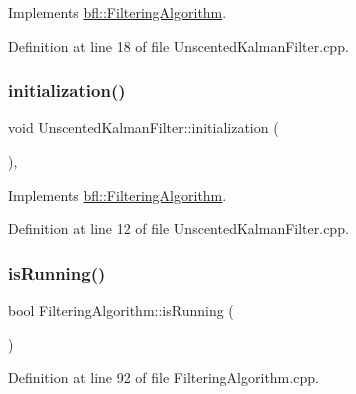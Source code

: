 Implements \mbox{\hyperlink{classbfl_1_1FilteringAlgorithm_acdfebf68405a427491e4dd9d020ae09b}{bfl\+::\+Filtering\+Algorithm}}.



Definition at line 18 of file Unscented\+Kalman\+Filter.\+cpp.

\mbox{\label{classbfl_1_1UnscentedKalmanFilter_acd5cfc6344d9ce24fb980aa22ecf4895}} 
\subsubsection{\texorpdfstring{initialization()}{initialization()}}
{\footnotesize\ttfamily void Unscented\+Kalman\+Filter\+::initialization (\begin{DoxyParamCaption}{ }\end{DoxyParamCaption})\hspace{0.3cm}{\ttfamily [override]}, {\ttfamily [virtual]}}



Implements \mbox{\hyperlink{classbfl_1_1FilteringAlgorithm_af2a072aa51407fe5544bdbb7ce466e2a}{bfl\+::\+Filtering\+Algorithm}}.



Definition at line 12 of file Unscented\+Kalman\+Filter.\+cpp.

\mbox{\label{classbfl_1_1FilteringAlgorithm_a5cfecab2c778620e2557237472bb1721}} 
\subsubsection{\texorpdfstring{is\+Running()}{isRunning()}}
{\footnotesize\ttfamily bool Filtering\+Algorithm\+::is\+Running (\begin{DoxyParamCaption}{ }\end{DoxyParamCaption})\hspace{0.3cm}{\ttfamily [inherited]}}



Definition at line 92 of file Filtering\+Algorithm.\+cpp.



